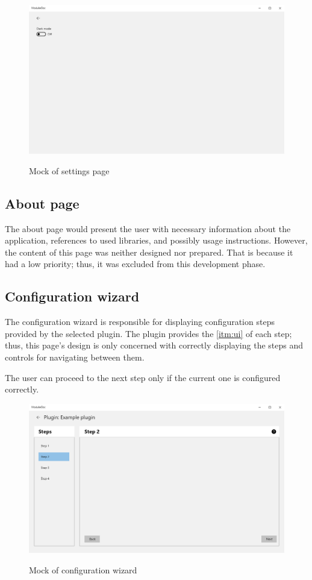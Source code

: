 \begin{figure}[H]
    \includegraphics[width=\linewidth]{img/mockSettings.png}
    \label{fig:settingsPage}
    \caption{Mock of settings page}
\end{figure}

\subsection{About page}

The about page would present the user with necessary information about the application, references to used libraries, and possibly usage instructions. However, the content of this page was neither designed nor prepared. That is because it had a low priority; thus, it was excluded from this development phase.

\pagebreak
\subsection{Configuration wizard}

The configuration wizard is responsible for displaying configuration steps provided by the selected plugin. The plugin provides the \ref{itm:ui} of each step; thus, this page's design is only concerned with correctly displaying the steps and controls for navigating between them.

The user can proceed to the next step only if the current one is configured correctly.

\begin{figure}[H]
    \includegraphics[width=\linewidth]{img/mockConfigurator.png}
    \label{fig:configuratorPage}
    \caption{Mock of configuration wizard}
\end{figure}

